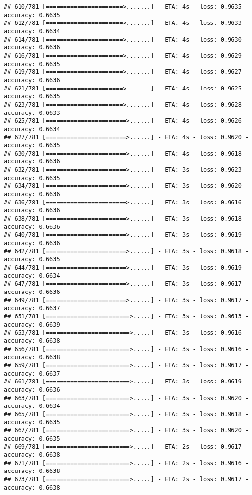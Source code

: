 \documentclass[
]{article}
\begin{document}
\begin{verbatim}
## 610/781 [======================>.......] - ETA: 4s - loss: 0.9635 - accuracy: 0.6635
## 612/781 [======================>.......] - ETA: 4s - loss: 0.9633 - accuracy: 0.6634
## 614/781 [======================>.......] - ETA: 4s - loss: 0.9630 - accuracy: 0.6636
## 616/781 [======================>.......] - ETA: 4s - loss: 0.9629 - accuracy: 0.6635
## 619/781 [======================>.......] - ETA: 4s - loss: 0.9627 - accuracy: 0.6636
## 621/781 [======================>.......] - ETA: 4s - loss: 0.9625 - accuracy: 0.6635
## 623/781 [======================>.......] - ETA: 4s - loss: 0.9628 - accuracy: 0.6633
## 625/781 [=======================>......] - ETA: 4s - loss: 0.9626 - accuracy: 0.6634
## 627/781 [=======================>......] - ETA: 4s - loss: 0.9620 - accuracy: 0.6635
## 630/781 [=======================>......] - ETA: 4s - loss: 0.9618 - accuracy: 0.6636
## 632/781 [=======================>......] - ETA: 3s - loss: 0.9623 - accuracy: 0.6635
## 634/781 [=======================>......] - ETA: 3s - loss: 0.9620 - accuracy: 0.6636
## 636/781 [=======================>......] - ETA: 3s - loss: 0.9616 - accuracy: 0.6636
## 638/781 [=======================>......] - ETA: 3s - loss: 0.9618 - accuracy: 0.6636
## 640/781 [=======================>......] - ETA: 3s - loss: 0.9619 - accuracy: 0.6636
## 642/781 [=======================>......] - ETA: 3s - loss: 0.9618 - accuracy: 0.6635
## 644/781 [=======================>......] - ETA: 3s - loss: 0.9619 - accuracy: 0.6634
## 647/781 [=======================>......] - ETA: 3s - loss: 0.9617 - accuracy: 0.6636
## 649/781 [=======================>......] - ETA: 3s - loss: 0.9617 - accuracy: 0.6637
## 651/781 [========================>.....] - ETA: 3s - loss: 0.9613 - accuracy: 0.6639
## 653/781 [========================>.....] - ETA: 3s - loss: 0.9616 - accuracy: 0.6638
## 656/781 [========================>.....] - ETA: 3s - loss: 0.9616 - accuracy: 0.6638
## 659/781 [========================>.....] - ETA: 3s - loss: 0.9617 - accuracy: 0.6637
## 661/781 [========================>.....] - ETA: 3s - loss: 0.9619 - accuracy: 0.6636
## 663/781 [========================>.....] - ETA: 3s - loss: 0.9620 - accuracy: 0.6634
## 665/781 [========================>.....] - ETA: 3s - loss: 0.9618 - accuracy: 0.6635
## 667/781 [========================>.....] - ETA: 3s - loss: 0.9620 - accuracy: 0.6635
## 669/781 [========================>.....] - ETA: 2s - loss: 0.9617 - accuracy: 0.6638
## 671/781 [========================>.....] - ETA: 2s - loss: 0.9616 - accuracy: 0.6638
## 673/781 [========================>.....] - ETA: 2s - loss: 0.9617 - accuracy: 0.6638

\end{verbatim}
\end{document}
